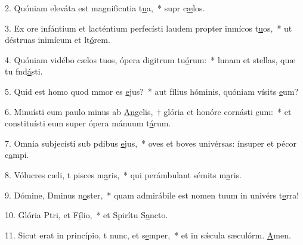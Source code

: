 2. Quóniam eleváta est magnificntia t\uline{u}a,~* supr c\uline{æ}los.\par 
3. Ex ore infántium et lacténtium perfecísti laudem propter inmícos t\uline{u}os,~* ut déstruas inimícum et lt\uline{ó}rem.\par 
4. Quóniam vidébo cælos tuos, ópera digitrum tu\uline{ó}rum:~* lunam et stellas, quæ tu fnd\uline{á}sti.\par 
5. Quid est homo quod mmor es \uline{e}jus?~* aut fílius hóminis, quóniam vísits \uline{e}um?\par 
6. Minuísti eum paulo minus ab \uline{An}gelis,~† glória et honóre cornásti \uline{e}um:~* et constituísti eum super ópera mánuum t\uline{á}rum.\par 
7. Omnia subjecísti sub pdibus \uline{e}jus,~* oves et boves univérsas: ínsuper et pécor c\uline{a}mpi.\par 
8. Vólucres cæli, t pisces m\uline{a}ris,~* qui perámbulant sémits m\uline{a}ris.\par 
9. Dómine, Dminus n\uline{o}ster,~* quam admirábile est nomen tuum in univérs t\uline{e}rra!\par 
10. Glória Ptri, et F\uline{í}lio,~* et Spirítu S\uline{a}ncto.\par 
11. Sicut erat in princípio, t nunc, et s\uline{e}mper,~* et in sǽcula sæculórm. \uline{A}men.\par 
